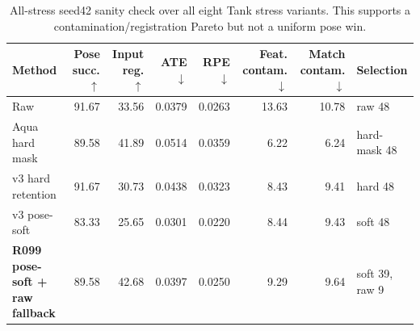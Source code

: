 \begin{table}[t]
\centering
\small
\caption{All-stress seed42 sanity check over all eight Tank stress variants. This supports a contamination/registration Pareto but not a uniform pose win.}
\label{tab:aqua_allstress_r101}
\begin{tabular}{lrrrrrrl}
\toprule
Method & Pose succ. $\uparrow$ & Input reg. $\uparrow$ & ATE $\downarrow$ & RPE $\downarrow$ & Feat. contam. $\downarrow$ & Match contam. $\downarrow$ & Selection \\
\midrule
Raw & 91.67 & 33.56 & 0.0379 & 0.0263 & 13.63 & 10.78 & raw 48 \\
Aqua hard mask & 89.58 & 41.89 & 0.0514 & 0.0359 & 6.22 & 6.24 & hard-mask 48 \\
v3 hard retention & 91.67 & 30.73 & 0.0438 & 0.0323 & 8.43 & 9.41 & hard 48 \\
v3 pose-soft & 83.33 & 25.65 & 0.0301 & 0.0220 & 8.44 & 9.43 & soft 48 \\
\textbf{R099 pose-soft + raw fallback} & 89.58 & 42.68 & 0.0397 & 0.0250 & 9.29 & 9.64 & soft 39, raw 9 \\
\bottomrule
\end{tabular}
\end{table}
